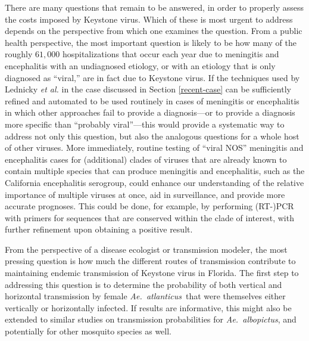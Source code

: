 \documentclass[12pt]{article}
\newcommand{\alb}{\textit{Ae.\ albopictus}}
\newcommand{\atl}{\textit{Ae.\ atlanticus}}
\begin{document}
        There are many questions that remain to be answered, in order to properly assess the costs imposed by Keystone virus. Which of these is most urgent to address depends on the perspective from which one examines the question. From a public health perspective, the most important question is likely to be how many of the roughly $61,000$ hospitalizations that occur each year due to meningitis and encephalitis with an undiagnosed etiology\cite{holmquist2008meningitis,george2014encephalitis}, or with an etiology that is only diagnosed as ``viral,'' are in fact due to Keystone virus. If the techniques used by Lednicky \textit{et al.}\cite{lednicky2018keystone} in the case discussed in Section \ref{recent-case} can be sufficiently refined and automated to be used routinely in cases of meningitis or encephalitis in which other approaches fail to provide a diagnosis---or to provide a diagnosis more specific than ``probably viral''---this would provide a systematic way to address not only this question, but also the analogous questions for a whole host of other viruses. More immediately, routine testing of ``viral NOS'' meningitis and encephalitis cases for (additional) clades of viruses that are already known to contain multiple species that can produce meningitis and encephalitis, such as the California encephalitis serogroup, could enhance our understanding of the relative importance of multiple viruses at once, aid in surveillance, and provide more accurate prognoses. This could be done, for example, by performing (RT-)PCR with primers for sequences that are conserved within the clade of interest, with further refinement upon obtaining a positive result.

        From the perspective of a disease ecologist or transmission modeler, the most pressing question is how much the different routes of transmission contribute to maintaining endemic transmission of Keystone virus in Florida. The first step to addressing this question is to determine the probability of both vertical and horizontal transmission by female \atl\ that were themselves either vertically or horizontally infected. If results are informative, this might also be extended to similar studies on transmission probabilities for \alb, and potentially for other mosquito species as well.
\end{document}
